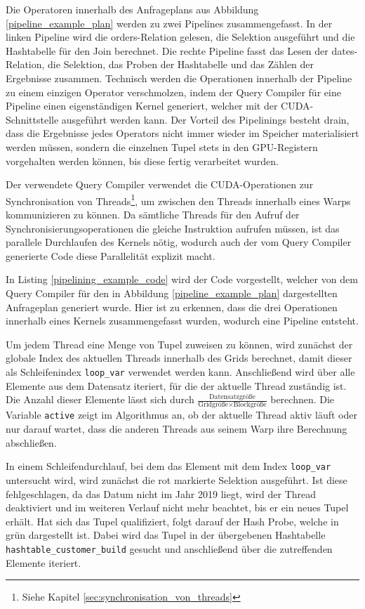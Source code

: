 Die Operatoren innerhalb des Anfrageplans aus Abbildung \ref{pipeline_example_plan} werden zu zwei Pipelines zusammengefasst.
In der linken Pipeline wird die \textsf{orders}-Relation gelesen, die Selektion ausgeführt und die Hashtabelle für den Join berechnet.
Die rechte Pipeline fasst das Lesen der \textsf{dates}-Relation, die Selektion, das Proben der Hashtabelle und das Zählen der Ergebnisse zusammen.
Technisch werden die Operationen innerhalb der Pipeline zu einem einzigen Operator verschmolzen, indem der Query Compiler für eine Pipeline einen eigenständigen Kernel generiert, welcher mit der CUDA-Schnittstelle ausgeführt werden kann.
Der Vorteil des Pipelinings besteht drain, dass die Ergebnisse jedes Operators nicht immer wieder im Speicher materialisiert werden müssen, sondern die einzelnen Tupel stets in den GPU-Registern vorgehalten werden können, bis diese fertig verarbeitet wurden.

Der verwendete Query Compiler verwendet die CUDA-Operationen zur Synchronisation von Threads\footnote{Siehe Kapitel \ref{sec:synchronisation_von_threads}}, um zwischen den Threads innerhalb eines Warps kommunizieren zu können.
Da sämtliche Threads für den Aufruf der Synchronisierungsoperationen die gleiche Instruktion aufrufen müssen, ist das parallele Durchlaufen des Kernels nötig, wodurch auch der vom Query Compiler generierte Code diese Parallelität explizit macht.

In Listing \ref{pipelining_example_code} wird der Code vorgestellt, welcher von dem Query Compiler für den in Abbildung \ref{pipeline_example_plan} dargestellten Anfrageplan generiert wurde.
Hier ist zu erkennen, dass die drei Operationen innerhalb eines Kernels zusammengefasst wurden, wodurch eine Pipeline entsteht.

Um jedem Thread eine Menge von Tupel zuweisen zu können, wird zunächst der globale Index des aktuellen Threads innerhalb des Grids berechnet, damit dieser als Schleifenindex \texttt{loop\_var} verwendet werden kann.
Anschließend wird über alle Elemente aus dem Datensatz iteriert, für die der aktuelle Thread zuständig ist.
Die Anzahl dieser Elemente lässt sich durch $\frac{\text{Datensatzgröße}}{\text{Gridgröße} \times \text{Blockgröße}}$ berechnen.
Die Variable \texttt{active} zeigt im Algorithmus an, ob der aktuelle Thread aktiv läuft oder nur darauf wartet, dass die anderen Threads aus seinem Warp ihre Berechnung abschließen.

In einem Schleifendurchlauf, bei dem das Element mit dem Index \texttt{loop\_var} untersucht wird, wird zunächst die rot markierte Selektion ausgeführt.
Ist diese fehlgeschlagen, da das Datum nicht im Jahr 2019 liegt, wird der Thread deaktiviert und im weiteren Verlauf nicht mehr beachtet, bis er ein neues Tupel erhält.
Hat sich das Tupel qualifiziert, folgt darauf der Hash Probe, welche in grün dargestellt ist.
Dabei wird das Tupel in der übergebenen Hashtabelle \texttt{hashtable\_customer\_build} gesucht und anschließend über die zutreffenden Elemente iteriert.

